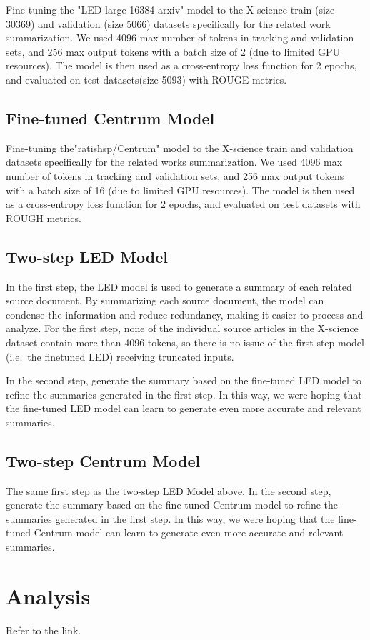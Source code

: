 \documentclass[12pt, twocolumn]{article}
\numberwithin{equation}{section}
\begin{document}
Fine-tuning the "LED-large-16384-arxiv" model to the X-science train (size 30369) and validation (size 5066) datasets specifically for the related work summarization. We used 4096 max number of tokens in tracking and validation sets, and 256 max output tokens with a batch size of 2 (due to limited GPU resources). The model is then used as a cross-entropy loss function for 2 epochs, and evaluated on test datasets(size 5093) with ROUGE metrics.

\subsection{Fine-tuned Centrum Model}
\label{app:model-ft-centrum}

Fine-tuning the"ratishsp/Centrum" model to the X-science train and validation datasets specifically for the related works summarization. We used 4096 max number of tokens in tracking and validation sets, and 256 max output tokens with a batch size of 16 (due to limited GPU resources). The model is then used as a cross-entropy loss function for 2 epochs, and evaluated on test datasets with ROUGH metrics.

\subsection{Two-step LED Model}
\label{app:model-two-step-led}

In the first step, the LED model is used to generate a summary of each related source document. By summarizing each source document, the model can condense the information and reduce redundancy, making it easier to process and analyze. For the first step, none of the individual source articles in the X-science dataset contain more than 4096 tokens, so there is no issue of the first step model (i.e.~the finetuned LED) receiving truncated inputs.

In the second step, generate the summary based on the fine-tuned LED model to refine the summaries generated in the first step. In this way, we were hoping that the fine-tuned LED model can learn to generate even more accurate and relevant summaries.

\subsection{Two-step Centrum Model}
\label{app:model-two-step-centrum}

The same first step as the two-step LED Model above. In the second step, generate the summary based on the fine-tuned Centrum model to refine the summaries generated in the first step. In this way, we were hoping that the fine-tuned Centrum model can learn to generate even more accurate and relevant summaries.

\section{Analysis}
\label{app:analysis}

Refer to the link.

{
    \footnotesize
    
    
}
\end{document}
